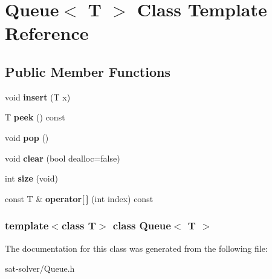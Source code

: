 \hypertarget{classQueue}{\section{\-Queue$<$ \-T $>$ \-Class \-Template \-Reference}
\label{classQueue}
}
\subsection*{\-Public \-Member \-Functions}
\begin{DoxyCompactItemize}
\item 
\hypertarget{classQueue_a1d313317eb2c8a1b41e2bf85f33f121b}{void {\bfseries insert} (\-T x)}\label{classQueue_a1d313317eb2c8a1b41e2bf85f33f121b}

\item 
\hypertarget{classQueue_a12e913387d6d082d473d7e8d919943d9}{\-T {\bfseries peek} () const }\label{classQueue_a12e913387d6d082d473d7e8d919943d9}

\item 
\hypertarget{classQueue_a02ea784625fe33b5793d00c3b02b4878}{void {\bfseries pop} ()}\label{classQueue_a02ea784625fe33b5793d00c3b02b4878}

\item 
\hypertarget{classQueue_a24d60f28f7ea91dfe71804f6c9b00805}{void {\bfseries clear} (bool dealloc=false)}\label{classQueue_a24d60f28f7ea91dfe71804f6c9b00805}

\item 
\hypertarget{classQueue_a05135474a17e883dc4fe2b0560032459}{int {\bfseries size} (void)}\label{classQueue_a05135474a17e883dc4fe2b0560032459}

\item 
\hypertarget{classQueue_acaefcc6efcb518de379b65c27befbc81}{const \-T \& {\bfseries operator\mbox{[}$\,$\mbox{]}} (int index) const }\label{classQueue_acaefcc6efcb518de379b65c27befbc81}

\end{DoxyCompactItemize}
\subsubsection*{template$<$class T$>$ class Queue$<$ T $>$}



\-The documentation for this class was generated from the following file\-:\begin{DoxyCompactItemize}
\item 
sat-\/solver/\-Queue.\-h\end{DoxyCompactItemize}
